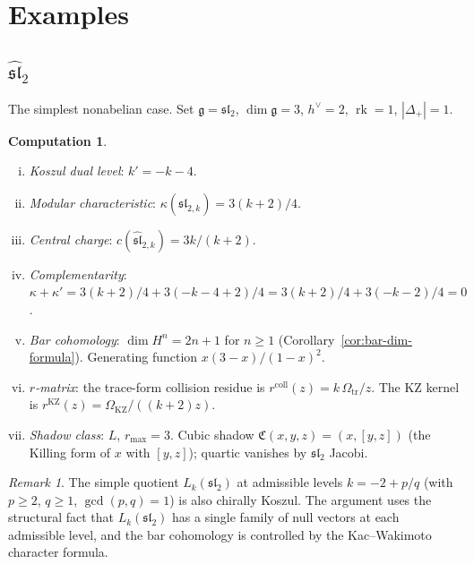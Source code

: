 \documentclass[11pt]{article}
\theoremstyle{plain}
\theoremstyle{definition}
\newtheorem{computation}[theorem]{Computation}
\theoremstyle{remark}
\newtheorem{remark}[theorem]{Remark}
\newcommand{\fg}{\mathfrak{g}}
\newcommand{\fsl}{\mathfrak{sl}}
\DeclareMathOperator{\rk}{rk}
\numberwithin{equation}{section}
\begin{document}

\section{Examples}\label{sec:examples}

\subsection{\texorpdfstring{$\widehat{\fsl}_2$}{sl2-hat}}

The simplest nonabelian case. Set $\fg = \fsl_2$,
$\dim\fg = 3$, $h^\vee = 2$, $\rk = 1$, $|\Delta_+| = 1$.

\begin{computation}\label{comp:sl2}
\begin{enumerate}[(i)]
\item \emph{Koszul dual level}:
 $k' = -k - 4$.
\item \emph{Modular characteristic}:
 $\kappa(\widehat{\fsl}_{2,k}) = 3(k+2)/4$.
\item \emph{Central charge}:
 $c(\widehat{\fsl}_{2,k}) = 3k/(k+2)$.
\item \emph{Complementarity}:
 $\kappa + \kappa' = 3(k{+}2)/4 + 3(-k{-}4{+}2)/4
 = 3(k{+}2)/4 + 3(-k{-}2)/4 = 0$.
\item \emph{Bar cohomology}:
 $\dim H^n = 2n + 1$ for $n \geq 1$
 (Corollary~\ref{cor:bar-dim-formula}).
 Generating function $x(3{-}x)/(1{-}x)^2$.
\item \emph{$r$-matrix}:
 the trace-form collision residue is
 \(r^{\mathrm{coll}}(z)=k\,\Omega_{\mathrm{tr}}/z\). The KZ kernel is
 \(r^{\mathrm{KZ}}(z)=\Omega_{\mathrm{KZ}}/((k+2)z)\).
\item \emph{Shadow class}: $L$, $r_{\max} = 3$.
 Cubic shadow $\mathfrak{C}(x,y,z)
 = (x,[y,z])$ (the Killing form of $x$ with
 $[y,z]$); quartic vanishes by $\fsl_2$ Jacobi.
\end{enumerate}
\end{computation}

\begin{remark}\label{rem:sl2-admissible}
The simple quotient $L_k(\fsl_2)$ at admissible
levels $k = -2 + p/q$ (with $p \geq 2$, $q \geq 1$,
$\gcd(p,q) = 1$) is also chirally Koszul.
The argument uses the structural fact that
$L_k(\fsl_2)$ has a single family of null vectors
at each admissible level, and the bar cohomology is
controlled by the Kac--Wakimoto character formula.
\end{remark}
\end{document}
